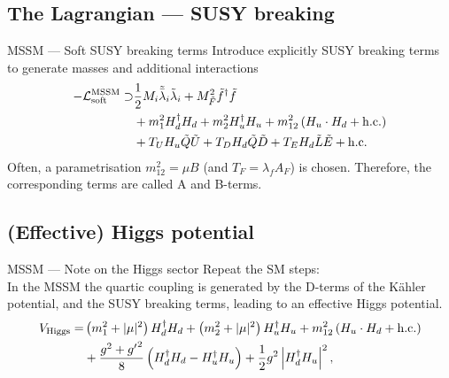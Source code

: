\subsection{The Lagrangian — SUSY breaking}
\begin{frame}{MSSM — Soft SUSY breaking terms}
Introduce explicitly SUSY breaking terms to generate masses and additional interactions
\begin{align*}\nonumber
  -\mathcal{L}^\mathrm{MSSM}_\mathrm{soft}\supset&\frac12M_i\tilde{\bar{\lambda}}_i\tilde{\lambda}_i+M^2_{\tilde{F}}\tilde{f}^\dagger\tilde{f}\\
  &+m_1^2H_d^\dagger H_d+m_2^2H_u^\dagger H_u+m_{12}^2\left(H_u\cdot H_d+\mathrm{h. c.}\right)\\\nonumber
  &+T_UH_u\tilde{Q}\tilde{U}+T_DH_d\tilde{Q}\tilde{D}+T_EH_d\tilde{L}\tilde{E}+\mathrm{h. c.}
\end{align*}
Often, a parametrisation $m_{12}^2=\mu B$ (and $T_F=\lambda_f A_F$) is chosen. Therefore, the corresponding terms are called \alert{A} and \alert{B-terms}.
\end{frame}
\subsection{(Effective) Higgs potential}
\begin{frame}{MSSM — Note on the Higgs sector}
Repeat the SM steps:\\
In the MSSM the quartic coupling is generated by the \alert{D-terms} of the Kähler potential, and the SUSY breaking terms, leading to an effective Higgs potential.
\begin{align*}\nonumber
  V_\mathrm{Higgs}=&\left(m_1^2+|\mu|^2\right)H_d^\dagger H_d+\left(m_2^2+|\mu|^2\right)H_u^\dagger H_u+m_{12}^2\left(H_u\cdot H_d+\mathrm{h. c.}\right)\\
  &+\frac{g^2+{g'}^2}8\left(H_d^\dagger H_d-H_u^\dagger H_u\right)+\frac12g^2\left|H_d^\dagger H_u\right|^2,
\end{align*}
\end{frame}
